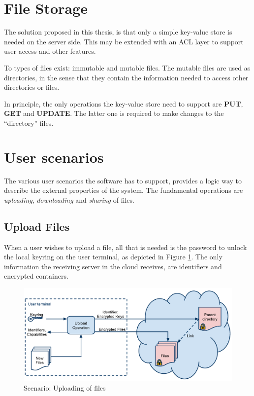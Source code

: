 \documentclass[english,12pt,a4paper]{book}
\begin{document}


\section{File Storage}

The solution proposed in this thesis, is that only a simple key-value store is
needed on the server side. This may be extended with an \ac{ACL} layer to
support user access and other features.

To types of files exist: immutable and mutable files. The mutable files are used
as directories, in the sense that they contain the information needed to access
other directories or files.

In principle, the only operations the key-value store need to support are
\textbf{PUT}, \textbf{GET} and \textbf{UPDATE}. The latter one is required to
make changes to the ``directory'' files.



\section{User scenarios}

The various user scenarios the software has to support, provides a logic way to
describe the external properties of the system. The fundamental operations are
\emph{uploading}, \emph{downloading} and \emph{sharing} of files.

\subsection{Upload Files}

When a user wishes to upload a file, all that is needed is the password to
unlock the local keyring on the user terminal, as depicted in Figure
\ref{fig:arch:upload}. The only information the receiving server in the cloud
receives, are identifiers and encrypted containers.

\begin{figure}[h!]
    \centering
    \includegraphics[width=\columnwidth]{ArchitectureUpload.pdf}
    \caption{Scenario: Uploading of files}
    \label{fig:arch:upload}
\end{figure}
\end{document}
